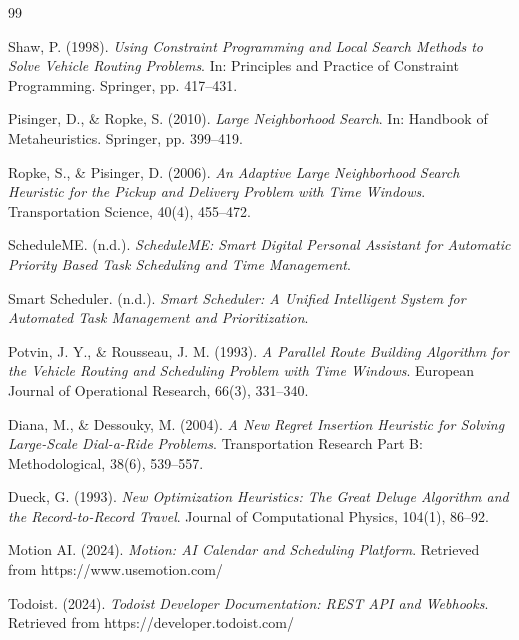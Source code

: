 \documentclass{article}
\begin{document}
\begin{thebibliography}{99}

Shaw, P. (1998).
\textit{Using Constraint Programming and Local Search Methods to Solve Vehicle Routing Problems}.
In: Principles and Practice of Constraint Programming. Springer, pp. 417--431.

Pisinger, D., \& Ropke, S. (2010).
\textit{Large Neighborhood Search}.
In: Handbook of Metaheuristics. Springer, pp. 399--419.

Ropke, S., \& Pisinger, D. (2006).
\textit{An Adaptive Large Neighborhood Search Heuristic for the Pickup and Delivery Problem with Time Windows}.
Transportation Science, 40(4), 455--472.

ScheduleME. (n.d.).
\textit{ScheduleME: Smart Digital Personal Assistant for Automatic Priority Based Task Scheduling and Time Management}.

Smart Scheduler. (n.d.).
\textit{Smart Scheduler: A Unified Intelligent System for Automated Task Management and Prioritization}.

Potvin, J. Y., \& Rousseau, J. M. (1993).
\textit{A Parallel Route Building Algorithm for the Vehicle Routing and Scheduling Problem with Time Windows}.
European Journal of Operational Research, 66(3), 331--340.

Diana, M., \& Dessouky, M. (2004).
\textit{A New Regret Insertion Heuristic for Solving Large-Scale Dial-a-Ride Problems}.
Transportation Research Part B: Methodological, 38(6), 539--557.

Dueck, G. (1993).
\textit{New Optimization Heuristics: The Great Deluge Algorithm and the Record-to-Record Travel}.
Journal of Computational Physics, 104(1), 86--92.

Motion AI. (2024).
\textit{Motion: AI Calendar and Scheduling Platform}.
Retrieved from https://www.usemotion.com/

Todoist. (2024).
\textit{Todoist Developer Documentation: REST API and Webhooks}.
Retrieved from https://developer.todoist.com/

\end{thebibliography}
\end{document}
